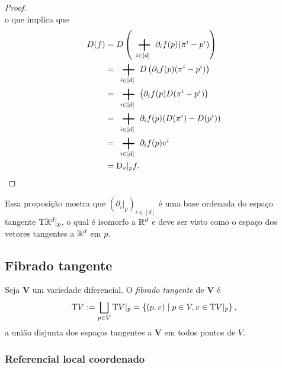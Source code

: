 \begin{proof}
\begin{equation*}
	\end{equation*}
o que implica que
	\begin{align*}
	D(f) &= D\left( \sum_{i \in [d]} \partial_i f(p) (\pi^i-p^i) \right) \\
		&= \sum_{i \in [d]} D\left( \partial_i f(p) (\pi^i-p^i) \right) \\
		&= \sum_{i \in [d]} \left( \partial_i f(p) D(\pi^i-p^i) \right) \\
		&= \sum_{i \in [d]} \partial_i f(p) (D(\pi^i)-D(p^i)) \\
		&= \sum_{i \in [d]} \partial_i f(p) v^i \\
		&= \D_v|_p f.
	\end{align*}
\end{proof}

Essa proposição mostra que $\left( \partial_i|_p \right)_{i \in [d]}$ é uma base ordenada do espaço tangente $\mathrm{T} \mathbb{R}^d|_p$, o qual é isomorfo a $\mathbb{R}^d$ e deve ser visto como o espaço dos vetores tangentes a $\mathbb{R}^d$ em $p$.

\subsection{Fibrado tangente}

\begin{definition}
Seja $\bm V$ um variedade diferencial. O \emph{fibrado tangente} de $\bm V$ é
	\begin{equation*}
	\mathrm{T} V := \bigsqcup_{p \in V} \mathrm{T} V|_p = \left\{{(p,v)}\;\middle\vert\;{p \in V,v \in \mathrm{T} V|_p}\right\},
	\end{equation*}
a união disjunta dos espaços tangentes a $\bm V$ em todos pontos de $V$. 
\end{definition}

\subsubsection{Referencial local coordenado}

